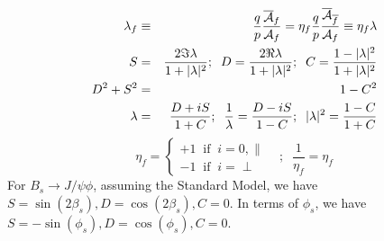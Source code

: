 \documentclass[a4paper,9pt,twosided]{article}
\begin{document}
\begin{eqnarray}
   \lambda_f &\equiv& \frac{q}{p}\frac{\overline{\cal A}_f}{{\cal A}_f} = \eta_f\frac{q}{p} \frac{\overline{\cal A}_{\overline{f}}}{{\cal A}_f} \equiv \eta_f \lambda\\
   S &=& \frac{2 \Im \lambda}{1+|\lambda|^2};\;\; D = \frac{2 \Re \lambda}{1+|\lambda|^2};\;\; C = \frac{1-|\lambda|^2 }{1+|\lambda|^2}\\
   D^2+S^2 & = & 1 - C^2 \\
   \lambda & = & \frac{D+iS}{1+C};\;\; \frac{1}{\lambda}  =  \frac{D-iS}{1-C};\;\; |\lambda|^2 = \frac{ 1-C }{ 1+C }
\end{eqnarray}
\begin{equation}
  \eta_f = \left\{ \begin{array}{l} +1 \;\; \mathrm{if}\;\; i=0,\parallel  \\ -1\;\; \mathrm{if}\;\; i=\perp \end{array} \right. \;\;\;;\;\; \frac{1}{\eta_f}=\eta_f
  \label{eq:etadef}
\end{equation}
For $B_s\rightarrow J/\psi\phi$, assuming the Standard Model,  we have $S=\sin(2\beta_s),D=\cos(2\beta_s),C=0$.
In terms of $\phi_s$, we have $S=-\sin(\phi_s),D=\cos(\phi_s),C=0$.
\end{document}
